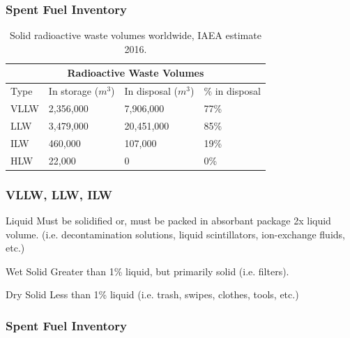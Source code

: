 

\begin{frame}[fragile]
        \frametitle{Spent Fuel Inventory}
    \begin{table}
      \centering
      \begin{tabular}{l|lll}
        \multicolumn{4}{c}{\textbf{Radioactive Waste Volumes}}\\
        \hline
Type & In storage ($m^3$) & In disposal ($m^3$)  &  \% in disposal\\
        \hline
VLLW &   2,356,000 &   7,906,000  &  77\%\\
LLW  &  3,479,000  &  20,451,000 &   85\%\\
ILW  &  460,000  &  107,000  &  19\%\\
HLW  &  22,000 &   0   & 0\%\\
        \hline
      \end{tabular}
      \caption[SNF volumes]{Solid radioactive waste volumes worldwide, IAEA
      estimate 2016. \cite{iaea_country_2015}}
      \label{tab:vol}
    \end{table}
    \end{frame}

\begin{frame}[fragile]
        \frametitle{VLLW, LLW, ILW}
        \begin{block}{Liquid}
                Must be solidified or, must be packed in absorbant package 2x liquid volume.
                (i.e. decontamination solutions, liquid scintillators, 
                ion-exchange fluids, etc.)
        \end{block}
        \begin{block}{Wet Solid}
                Greater than 1\% liquid, but primarily solid (i.e. filters).
        \end{block}
        \begin{block}{Dry Solid}
                        Less than 1\% liquid (i.e. trash, swipes, clothes, 
                        tools, etc.)
        \end{block}
\end{frame}

\begin{frame}[fragile]
        \frametitle{Spent Fuel Inventory}
                
\end{frame}

